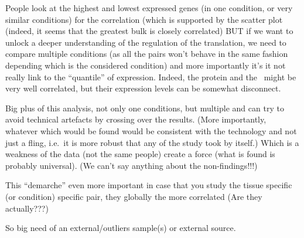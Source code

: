 People look at the highest and lowest expressed genes (in one condition, or very
similar conditions) for the correlation (which is supported by the scatter plot
(indeed, it seems that the greatest bulk is closely correlated) {\Large BUT} if we
want to unlock a deeper understanding of the regulation of the translation, we need
to compare multiple conditions (as all the pairs won't behave in the same fashion
depending which is the considered condition) and more importantly it's it not
really link to the ``quantile'' of expression. Indeed, the protein and the \mRNA\
might be very well correlated, but their expression levels can be somewhat disconnect.

Big plus of this analysis, not only one conditions, but multiple and can try to
avoid technical artefacts by crossing over the results. (More importantly, whatever
which would be found would be consistent with the technology and not just a fling,
i.e.\ it is more robust that any of the study took by itself.)
Which is a weakness of the data (not the same people) create a force (what is found
is probably universal). (We can't say anything about the non-findings!!!)

This ``demarche'' even more important in case that you study the tissue specific
(or condition) specific pair, they globally the more correlated (Are they actually???)

So big need of an external/outliers sample(s) or external source.














